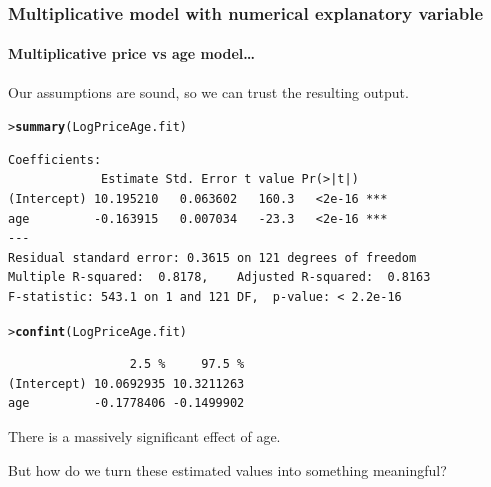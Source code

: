 \documentclass{beamer}\usepackage[]{graphicx}\usepackage[]{xcolor}
\makeatletter
\newcommand{\hlstd}[1]{\textcolor[rgb]{0.345,0.345,0.345}{#1}}%
\newcommand{\hlkwd}[1]{\textcolor[rgb]{0.737,0.353,0.396}{\textbf{#1}}}%
\newenvironment{kframe}{%
 \def\at@end@of@kframe{}%
 \ifinner\ifhmode%
  \def\at@end@of@kframe{\end{minipage}}%
  \begin{minipage}{\columnwidth}%
 \fi\fi%
 \def\FrameCommand##1{\hskip\@totalleftmargin \hskip-\fboxsep
 \colorbox{shadecolor}{##1}\hskip-\fboxsep
     \hskip-\linewidth \hskip-\@totalleftmargin \hskip\columnwidth}%
 \MakeFramed {\advance\hsize-\width
   \@totalleftmargin\z@ \linewidth\hsize
   \@setminipage}}%
 {\par\unskip\endMakeFramed%
 \at@end@of@kframe}
\newenvironment{knitrout}{}{} %
\makeatother
\begin{document}
\begin{frame}[fragile]
\frametitle{Multiplicative model with numerical explanatory variable}
\framesubtitle{Multiplicative price vs age model\ldots}
Our assumptions are sound, so we can trust the resulting output.

\begin{knitrout}\scriptsize
{}\color{fgcolor}\begin{kframe}
\begin{alltt}
\hlstd{> }\hlkwd{summary}\hlstd{(LogPriceAge.fit)}
\end{alltt}
\end{kframe}
\end{knitrout}

\begin{knitrout}\scriptsize
{}\color{fgcolor}\begin{kframe}
\begin{verbatim}
Coefficients:
             Estimate Std. Error t value Pr(>|t|)    
(Intercept) 10.195210   0.063602   160.3   <2e-16 ***
age         -0.163915   0.007034   -23.3   <2e-16 ***
---
Residual standard error: 0.3615 on 121 degrees of freedom
Multiple R-squared:  0.8178,	Adjusted R-squared:  0.8163 
F-statistic: 543.1 on 1 and 121 DF,  p-value: < 2.2e-16
\end{verbatim}
\end{kframe}
\end{knitrout}

\begin{knitrout}\scriptsize
{}\color{fgcolor}\begin{kframe}
\begin{alltt}
\hlstd{> }\hlkwd{confint}\hlstd{(LogPriceAge.fit)}
\end{alltt}
\begin{verbatim}
                 2.5 %     97.5 %
(Intercept) 10.0692935 10.3211263
age         -0.1778406 -0.1499902
\end{verbatim}
\end{kframe}
\end{knitrout}
There is a massively significant effect of age.
\bigskip

But how do we turn these estimated values into something meaningful?
\end{frame}
\end{document}
